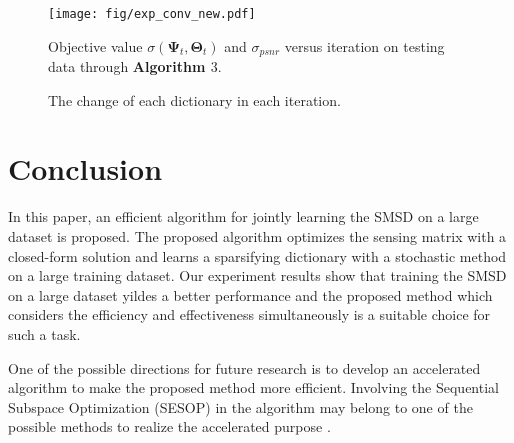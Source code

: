 \documentclass[final,5p,times,twocolumn]{elsarticle}
\begin{document}
\begin{figure}[!htb]
	\centering
	\texttt{[image: fig/exp\_conv\_new.pdf]}\\
	\caption{Objective value $\sigma(\bm\Psi_t,\bm\Theta_t)$ and $\sigma_{psnr}$ versus iteration on testing data through {\bf Algorithm $3$}.}\label{Convergence:experiment} %
\end{figure}

\begin{figure}[!htb]
	\centering
	\caption{The change of each dictionary in each iteration.}\label{Convergence:Diff_dic} %
\end{figure}

\section{Conclusion}\label{S_5}
In this paper, an efficient algorithm for jointly learning the SMSD on a large dataset is proposed. The proposed algorithm optimizes the sensing matrix with a closed-form solution and learns a sparsifying dictionary with a stochastic method on a large training dataset. Our experiment results show that training the SMSD on a large dataset yildes a better performance and the proposed method which considers the efficiency and effectiveness simultaneously is a suitable choice for such a task.

One of the possible directions for future research is to develop an accelerated algorithm to make the proposed method more efficient. Involving the Sequential Subspace Optimization (SESOP) in the algorithm may belong to one of the possible methods to realize the accelerated purpose \cite{RHGZ16}.
\end{document}
